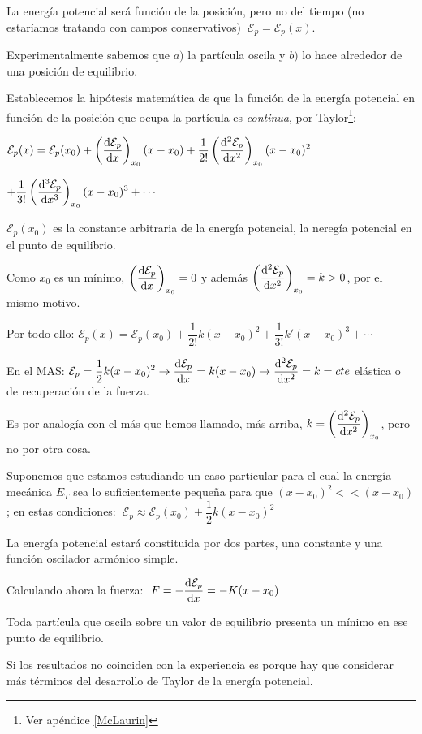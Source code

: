 La energía potencial será función de la posición, pero no del tiempo (no estaríamos tratando con campos conservativos) $\ \mathcal E_p=\mathcal E_p(x)$.

Experimentalmente sabemos que $a)$ la partícula oscila y $b)$ lo hace alrededor de una posición de equilibrio.

Establecemos la hipótesis matemática de que la función de la energía potencial en función de la posición que ocupa la partícula es \emph{continua}, por Taylor\footnote{Ver apéndice \ref{McLaurin}}:

$\displaystyle \mathcal E_p(x)=\mathcal E_p(x_0)+\left(\dv{\mathcal E_p}{x}\right)_{x_0}(x-x_0)+ \dfrac 1{2!}\left(\dv[2]{\mathcal E_p}{x}\right)_{x_0}(x-x_0)^2$

$\displaystyle +\dfrac 1{3!}\left(\dv[3]{\mathcal E_p}{x}\right)_{x_0}(x-x_0)^3+\cdots$

$\mathcal E_p(x_0)$ es la constante arbitraria de la energía potencial, la neregía potencial en el punto de equilibrio.

Como $x_0$ es un mínimo, $\displaystyle \left(\dv{\mathcal E_p}{x}\right)_{x_0}=0$ y además $\displaystyle \left(\dv[2]{\mathcal E_p}{x}\right)_{x_0}=k>0$, por el mismo motivo.

Por todo ello: $\displaystyle \mathcal E_p(x)=\mathcal E_p(x_0)+ \dfrac 1{2!} k(x-x_0)^2 +\dfrac 1 {3!} k' (x-x_0)^3 + \cdots$

En el MAS: $\displaystyle \mathcal E_p=\dfrac 1 2 k (x-x_0)^2 \to \dv{\mathcal E_p}{x}=k(x-x_0) \to \dv[2]{\mathcal E_p}{x}=k=cte$ elástica o de recuperación de la fuerza. 

Es por analogía con el más que hemos llamado, más arriba, $k=\displaystyle \left(\dv[2]{\mathcal E_p}{x}\right)_{x_0}$, pero no por otra cosa.

Suponemos que estamos estudiando un caso particular para el cual la energía mecánica $E_T$ sea lo suficientemente pequeña para que $(x-x_0)^2<<(x-x_0)$; en estas condiciones:
$\ \displaystyle \mathcal E_p \approx \mathcal E_p(x_0)+\dfrac 1 2 k (x-x_0)^2$

La energía potencial estará constituida por dos partes, una constante y una función oscilador armónico simple.

Calculando ahora la fuerza:  $\ F=-\displaystyle \dv{\mathcal E_p}{x}=-K(x-x_0)$

Toda partícula que oscila sobre un valor de equilibrio presenta un mínimo en ese punto de equilibrio.

Si los resultados no coinciden con la experiencia es porque hay que considerar más términos del desarrollo de Taylor de la energía potencial.

